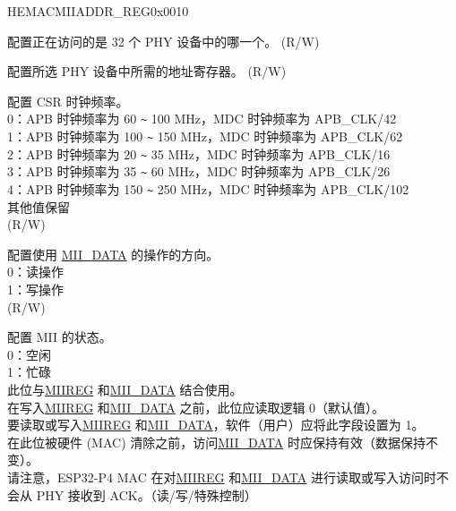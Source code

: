 \begin{register}{H}{EMACMIIADDR\_REG}{0x0010}\label{regdesc:EMACMIIADDRREG}
%
%
%
%
%
%
\regnewline%
\begin{regdesc}\begin{reglist}
\item [MIIDEV] 配置正在访问的是 32 个 PHY 设备中的哪一个。 (R/W)
\item [MIIREG]\label{fielddesc:MIIREG} 配置所选 PHY 设备中所需的地址寄存器。 (R/W)
\item  [MIICSRCLK]\label{fielddesc:MIICSRCLK} 配置 CSR 时钟频率。\\
0：APB 时钟频率为 60 \verb+~+ 100 MHz，MDC 时钟频率为 APB\_CLK/42\\
1：APB 时钟频率为 100 \verb+~+ 150 MHz，MDC 时钟频率为 APB\_CLK/62\\
2：APB 时钟频率为 20 \verb+~+ 35 MHz，MDC 时钟频率为 APB\_CLK/16\\
3：APB 时钟频率为 35 \verb+~+ 60 MHz，MDC 时钟频率为 APB\_CLK/26\\
4：APB 时钟频率为 150 \verb+~+ 250 MHz，MDC 时钟频率为 APB\_CLK/102\\
其他值保留\\(R/W) 
\item [MIIWRITE] 配置使用 \hyperref[regdesc:EMACMIIDATAREG]{MII\_DATA} 的操作的方向。\\
0：读操作\\
1：写操作\\(R/W)
\item [MIIBUSY]\label{fielddesc:MIIBUSY} 配置 MII 的状态。\\
0：空闲\\
1：忙碌\\
此位与\hyperref[fielddesc:MIIREG]{MIIREG} 和\hyperref[regdesc:EMACMIIDATAREG]{MII\_DATA} 结合使用。\\
在写入\hyperref[fielddesc:MIIREG]{MIIREG} 和\hyperref[regdesc:EMACMIIDATAREG]{MII\_DATA} 之前，此位应读取逻辑 0（默认值）。\\
要读取或写入\hyperref[fielddesc:MIIREG]{MIIREG} 和\hyperref[regdesc:EMACMIIDATAREG]{MII\_DATA}，软件（用户）应将此字段设置为 1。\\
在此位被硬件 (MAC) 清除之前，访问\hyperref[regdesc:EMACMIIDATAREG]{MII\_DATA} 时应保持有效（数据保持不变）。\\
请注意，ESP32-P4 MAC 在对\hyperref[fielddesc:MIIREG]{MIIREG} 和\hyperref[regdesc:EMACMIIDATAREG]{MII\_DATA} 进行读取或写入访问时不会从 PHY 接收到 ACK。（读/写/特殊控制）
\end{reglist}\end{regdesc}
\end{register}


